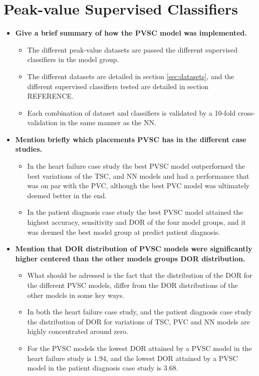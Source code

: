\section{Peak-value Supervised Classifiers}

\begin{itemize}
    \item \textbf{Give a brief summary of how the PVSC model was implemented.}
    \begin{itemize}
        \item The different peak-value datasets are passed the different supervised classifiers in the model group. 
        \item The different datasets are detailed in section \ref{sec:datasets}, and the different supervised classifiers tested are detailed in section REFERENCE.
        \item Each combination of dataset and classifiers is validated by a 10-fold cross-validation in the same manner as the NN. 
    \end{itemize}
    \item \textbf{Mention briefly which placements PVSC has in the different case studies.}
    \begin{itemize}
        \item In the heart failure case study the best PVSC model outperformed the best variations of the TSC, and NN models and had a performance that was on par with the PVC, although the best PVC model was ultimately deemed better in the end.
        \item In the patient diagnosis case study the best PVSC model attained the highest accuracy, sensitivity and DOR of the four model groups, and it was deemed the best model group at predict patient diagnosis. 
    \end{itemize}
    \item \textbf{Mention that DOR distribution of PVSC models were significantly higher centered than the other models groups DOR distribution.}
    \begin{itemize}
        \item What should be adressed is the fact that the distribution of the DOR for the different PVSC models, differ from the DOR distributions of the other models in some key ways.
        \item In both the heart failure case study, and the patient diagnosis case study the distribution of DOR for variations of TSC, PVC and NN models are highly concentrated around zero. 
        \item For the PVSC models the lowest DOR attained by a PVSC model in the heart failure study is 1.94, and the lowest DOR attained by a PVSC model in the patient diagnosis case study is 3.68.

\end{itemize}
\end{itemize}
